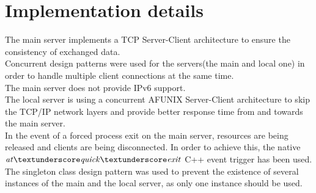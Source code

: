 \documentclass[runningheads]{llncs}
\begin{document}
\section{Implementation details}
The main server implements a TCP Server-Client architecture to ensure the consistency of exchanged data.\\
Concurrent design patterns were used for the servers(the main and local one) in order to handle multiple client connections at the same time.\\
The main server does not provide IPv6 support.\\
The local server is using a concurrent AF\textunderscore UNIX Server-Client architecture to skip the TCP/IP network layers and provide better response time from and towards the main server.\\
In the event of a forced process exit on the main server, resources are being released and clients are being disconnected. In order to achieve this, the native $\it {at\textunderscore quick\textunderscore exit}$ C++ event trigger has been used.\\
The singleton class design pattern was used to prevent the existence of several instances of the main and the local server, as only one instance should be used.
\end{document}
